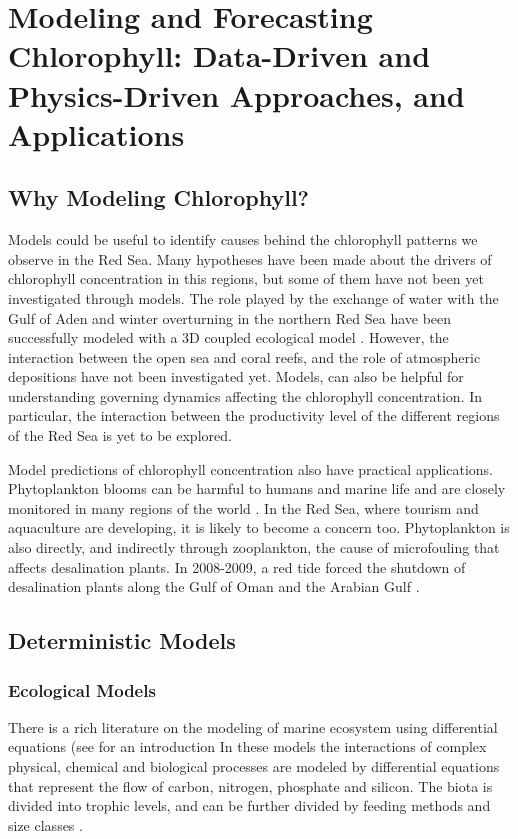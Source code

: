 \section{Modeling and Forecasting Chlorophyll: Data-Driven and Physics-Driven
Approaches, and Applications}

\subsection{Why Modeling Chlorophyll?}

Models could be useful to identify causes behind the chlorophyll patterns we
observe in the Red Sea. Many hypotheses have been made about the drivers of
chlorophyll concentration in this regions, but some of them have not been yet
investigated through models. The role played by the exchange of water with the
Gulf of Aden and winter overturning in the northern Red Sea have been
successfully modeled with a 3D coupled ecological model
\citep{Triantafyllou2014}. However, the interaction between the open sea and
coral reefs, and the role of atmospheric depositions have not been investigated
yet. Models, can also be helpful for understanding governing dynamics affecting
the chlorophyll concentration. In particular, the interaction between the
productivity level of the different regions of the Red Sea is yet to be
explored.

Model predictions of chlorophyll concentration also have practical
applications. Phytoplankton blooms can be harmful to humans and marine life and
are closely monitored in many regions of the world \citep{Pettersson2013}. In
the Red Sea, where tourism and aquaculture are developing, it is likely to
become a concern too. Phytoplankton is also directly, and indirectly through
zooplankton, the cause of microfouling that affects desalination plants. In
2008-2009, a red tide forced the shutdown of desalination plants along the Gulf
of Oman and the Arabian Gulf \citep{Richlen2010}.


\subsection{Deterministic Models}

\subsubsection{Ecological Models}

There is a rich literature on the modeling of marine ecosystem using
differential equations (see \citet{Fennel2004} for an introduction In these
models the interactions of complex physical, chemical and biological processes
are modeled by differential equations that represent the flow of carbon,
nitrogen, phosphate and silicon. The biota is divided into trophic levels, and
can be further divided by feeding methods and size classes
\citep{Triantafyllou2014}.

